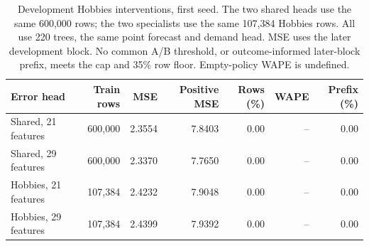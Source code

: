\begin{table}[t]
\caption{Development Hobbies interventions, first seed. The two shared heads use the same 600,000 rows; the two specialists use the same 107,384 Hobbies rows. All use 220 trees, the same point forecast and demand head. MSE uses the later development block. No common A/B threshold, or outcome-informed later-block prefix, meets the cap and 35\% row floor. Empty-policy WAPE is undefined.}
\label{tab:hobbies_intervention}
\centering
\small
\setlength{\tabcolsep}{3pt}
\begin{tabular}{lrrrrrr}
\toprule
Error head & Train rows & MSE & Positive MSE & Rows (\%) & WAPE & Prefix (\%) \\
\midrule
Shared, 21 features & 600,000 & 2.3554 & 7.8403 & 0.00 & -- & 0.00 \\
Shared, 29 features & 600,000 & 2.3370 & 7.7650 & 0.00 & -- & 0.00 \\
Hobbies, 21 features & 107,384 & 2.4232 & 7.9048 & 0.00 & -- & 0.00 \\
Hobbies, 29 features & 107,384 & 2.4399 & 7.9392 & 0.00 & -- & 0.00 \\
\bottomrule
\end{tabular}
\end{table}
